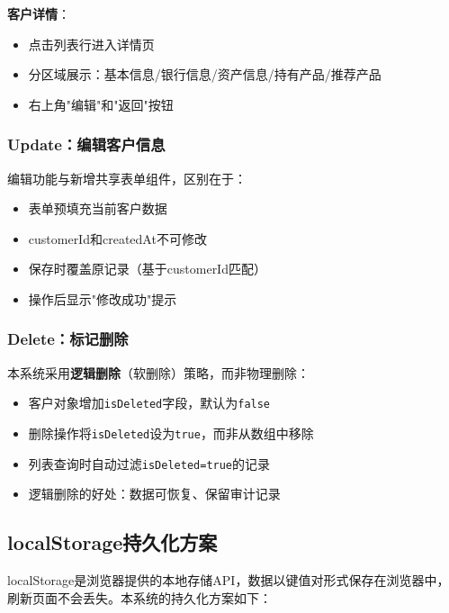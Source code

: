 \textbf{客户详情}：
\begin{itemize}[leftmargin=2em]
  \item 点击列表行进入详情页
  \item 分区域展示：基本信息/银行信息/资产信息/持有产品/推荐产品
  \item 右上角"编辑"和"返回"按钮
\end{itemize}

\subsubsection{Update：编辑客户信息}

编辑功能与新增共享表单组件，区别在于：
\begin{itemize}[leftmargin=2em]
  \item 表单预填充当前客户数据
  \item customerId和createdAt不可修改
  \item 保存时覆盖原记录（基于customerId匹配）
  \item 操作后显示"修改成功"提示
\end{itemize}

\subsubsection{Delete：标记删除}

本系统采用\textbf{逻辑删除}（软删除）策略，而非物理删除：
\begin{itemize}[leftmargin=2em]
  \item 客户对象增加\texttt{isDeleted}字段，默认为\texttt{false}
  \item 删除操作将\texttt{isDeleted}设为\texttt{true}，而非从数组中移除
  \item 列表查询时自动过滤\texttt{isDeleted=true}的记录
  \item 逻辑删除的好处：数据可恢复、保留审计记录
\end{itemize}

\subsection{localStorage持久化方案}

localStorage是浏览器提供的本地存储API，数据以键值对形式保存在浏览器中，刷新页面不会丢失。本系统的持久化方案如下：

